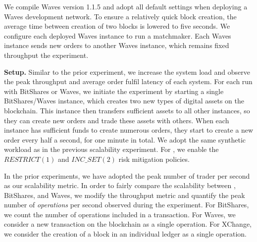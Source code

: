 We compile Waves version 1.1.5 and adopt all default settings when deploying a Waves development network.
To ensure a relatively quick block creation, the average time between creation of two blocks is lowered to five seconds.
We configure each deployed Waves instance to run a matchmaker.
Each Waves instance sends new orders to another Waves instance, which remains fixed throughput the experiment.

\textbf{Setup.}
Similar to the prior experiment, we increase the system load and observe the peak throughput and average order fulfil latency of each system.
For each run with BitShares or Waves, we initiate the experiment by starting a single BitShares/Waves instance, which creates two new types of digital assets on the blockchain.
This instance then transfers sufficient assets to all other instances, so they can create new orders and trade these assets with others.
When each instance has sufficient funds to create numerous orders, they start to create a new order every half a second, for one minute in total.
We adopt the same synthetic workload as in the previous scalability experiment.
For \ModelName{}, we enable the $ RESTRICT(1) $ and $ INC\_SET(2) $ risk mitigation policies.

In the prior experiments, we have adopted the peak number of trader per second as our scalability metric.
In order to fairly compare the scalability between \ModelName{}, BitShares, and Waves, we modify the throughput metric and quantify the peak number of \emph{operations} per second observed during the experiment.
For BitShares, we count the number of operations included in a transaction.
For Waves, we consider a new transaction on the blockchain as a single operation. %
For XChange, we consider the creation of a block in an individual ledger as a single operation. %

